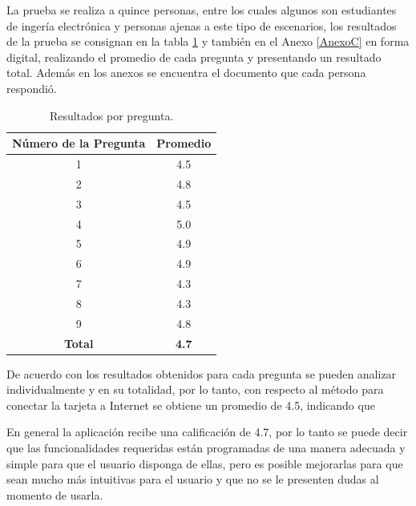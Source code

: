 La prueba se realiza a quince personas, entre los cuales algunos son estudiantes de ingería electrónica y personas ajenas a este tipo de escenarios, los resultados de la prueba se consignan en la tabla \ref{table:enc} y también en el Anexo \ref{AnexoC} en forma digital, realizando el promedio de cada pregunta y presentando un resultado total. Además en los anexos se encuentra el documento que cada persona respondió.

\begin{table}[H]
	\begin{center}
		\caption{Resultados por pregunta.}
		\label{table:enc}
		\begin{tabular}{|c|c|}
			\hline 
			\textbf{Número de la Pregunta} & \textbf{Promedio} \\ 
			\hline 
			1 & 4.5\\ 
			\hline 
			2 & 4.8\\ 
			\hline 
			3 & 4.5\\ 
			\hline 
			4 & 5.0\\ 
			\hline 
			5 & 4.9\\ 
			\hline 
			6 & 4.9\\ 
			\hline 
			7 & 4.3\\ 
			\hline 
			8 & 4.3\\ 
			\hline 
			9 & 4.8\\ 
			\hline 
			\textbf{Total} & \textbf{4.7}\\ 
			\hline 
		\end{tabular} 
	\end{center}
\end{table}

De acuerdo con los resultados obtenidos para cada pregunta se pueden analizar individualmente y en su totalidad, por lo tanto, con respecto al método para conectar la tarjeta a Internet se obtiene un promedio de 4.5, indicando que 

En general la aplicación recibe una calificación de 4.7, por lo tanto se puede decir que las funcionalidades requeridas están programadas de una manera adecuada y simple para que el usuario disponga de ellas, pero es posible mejorarlas para que sean mucho más intuitivas para el usuario y que no se le presenten dudas al momento de usarla.